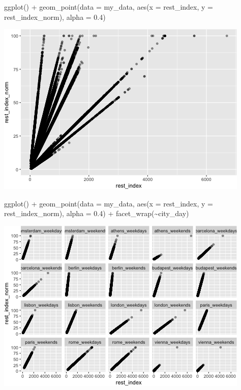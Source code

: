 \documentclass[
]{article}
\newenvironment{Shaded}{\begin{snugshade}}{\end{snugshade}}
\newcommand{\AttributeTok}[1]{\textcolor[rgb]{0.77,0.63,0.00}{#1}}
\newcommand{\FloatTok}[1]{\textcolor[rgb]{0.00,0.00,0.81}{#1}}
\newcommand{\FunctionTok}[1]{\textcolor[rgb]{0.00,0.00,0.00}{#1}}
\newcommand{\NormalTok}[1]{#1}
\newcommand{\SpecialCharTok}[1]{\textcolor[rgb]{0.00,0.00,0.00}{#1}}
\begin{document}
\begin{Shaded}
\begin{Highlighting}[]
\FunctionTok{ggplot}\NormalTok{() }\SpecialCharTok{+} \FunctionTok{geom\_point}\NormalTok{(}\AttributeTok{data =}\NormalTok{ my\_data, }\FunctionTok{aes}\NormalTok{(}\AttributeTok{x =}\NormalTok{ rest\_index, }\AttributeTok{y =}\NormalTok{ rest\_index\_norm),}
    \AttributeTok{alpha =} \FloatTok{0.4}\NormalTok{)}
\end{Highlighting}
\end{Shaded}

\includegraphics{Project_files/figure-latex/unnamed-chunk-9-1.png}

\begin{Shaded}
\begin{Highlighting}[]
\FunctionTok{ggplot}\NormalTok{() }\SpecialCharTok{+} \FunctionTok{geom\_point}\NormalTok{(}\AttributeTok{data =}\NormalTok{ my\_data, }\FunctionTok{aes}\NormalTok{(}\AttributeTok{x =}\NormalTok{ rest\_index, }\AttributeTok{y =}\NormalTok{ rest\_index\_norm),}
    \AttributeTok{alpha =} \FloatTok{0.4}\NormalTok{) }\SpecialCharTok{+} \FunctionTok{facet\_wrap}\NormalTok{(}\SpecialCharTok{\textasciitilde{}}\NormalTok{city\_day)}
\end{Highlighting}
\end{Shaded}

\includegraphics{Project_files/figure-latex/unnamed-chunk-9-2.png}
\end{document}
